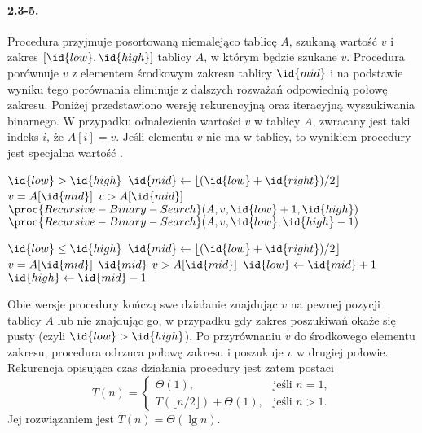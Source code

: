 \paragraph{2.3-5.}
Procedura  przyjmuje posortowaną niemalejąco tablicę $A$, szukaną wartość $v$ i zakres $[\id{low}, \id{high}]$ tablicy $A$, w którym będzie szukane $v$. Procedura porównuje $v$ z elementem środkowym zakresu tablicy $\id{mid}$ i na podstawie wyniku tego porównania eliminuje z dalszych rozważań odpowiednią połowę zakresu. Poniżej przedstawiono wersję rekurencyjną oraz iteracyjną wyszukiwania binarnego. W przypadku odnalezienia wartości $v$ w tablicy $A$, zwracany jest taki indeks $i$, że $A[i]=v$. Jeśli elementu $v$ nie ma w tablicy, to wynikiem procedury jest specjalna wartość .

\begin{codebox}
\li \If $\id{low}>\id{high}$
\li     \Then
            \Return {}
        \End
\li $\id{mid}\gets \left\lfloor(\id{low}+\id{right})/2\right\rfloor$
\li \If $v=A[\id{mid}]$
\li     \Then
            \Return {}
        \End
\li \If $v>A[\id{mid}]$
\li     \Then
            \Return $\proc{Recursive-Binary-Search}(A,v,\id{low}+1,\id{high})$
\li     \Else
            \Return $\proc{Recursive-Binary-Search}(A,v,\id{low},\id{high}-1)$
        \End
\end{codebox}

\begin{codebox}
\li \While $\id{low}\le \id{high}$
\li     \Do
            $\id{mid}\gets \left\lfloor(\id{low}+\id{right})/2\right\rfloor$
\li         \If $v=A[\id{mid}]$
\li             \Then
                    \Return $\id{mid}$
                \End
\li         \If $v>A[\id{mid}]$
\li             \Then
                    $\id{low}\gets \id{mid}+1$
\li             \Else
                    $\id{high}\gets \id{mid}-1$
                \End
        \End
\li \Return {}
\end{codebox}

Obie wersje procedury  kończą swe działanie znajdując $v$ na pewnej pozycji tablicy $A$ lub nie znajdując go, w przypadku gdy zakres poszukiwań okaże się pusty (czyli $\id{low}>\id{high}$). Po przyrównaniu $v$ do środkowego elementu zakresu, procedura odrzuca połowę zakresu i poszukuje $v$ w drugiej połowie. Rekurencja opisująca czas działania procedury jest zatem postaci
\[
	T(n) = \left\{\begin{array}{ll}
		\Theta(1), & \mbox{jeśli } n=1, \\
		T(\lfloor n/2\rfloor)+\Theta(1), & \mbox{jeśli } n>1.
	\end{array}\right.
\]
Jej rozwiązaniem jest $T(n)=\Theta(\lg n)$.

